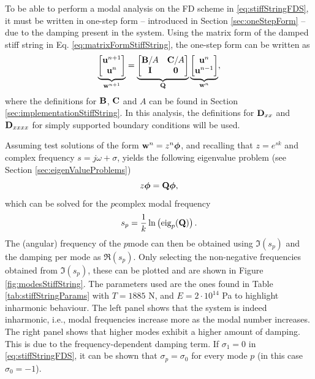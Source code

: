 {To be able to perform a modal analysis on the FD scheme in \eqref{eq:stiffStringFDS}, it must be written in one-step form -- introduced in Section \ref{sec:oneStepForm} -- due to the damping present in the system. Using the matrix form of the damped stiff string in Eq. \eqref{eq:matrixFormStiffString}, the one-step form can be written as
\begin{equation}\label{eq:oneStepFormStiffSTring}
    \underbrace{\begin{bmatrix}
        \mathbf{u}^{n+1}\\
        \mathbf{u}^n
    \end{bmatrix}}_{\mathbf{w}^{n+1}} = 
    \underbrace{\begin{bmatrix}
        \mathbf{B}/A & \mathbf{C}/A\\
        \mathbf{I} & \mathbf{0}
    \end{bmatrix}}_{\mathbf{Q}}
    \underbrace{\begin{bmatrix}
        \mathbf{u}^n\\
        \mathbf{u}^{n-1}
    \end{bmatrix}}_{\mathbf{w}^n},
\end{equation}
where the definitions for $\mathbf{B}$, $\mathbf{C}$ and $A$ can be found in Section \ref{sec:implementationStiffString}. In this analysis, the definitions for $\mathbf{D}_{xx}$ and $\mathbf{D}_{xxxx}$ for simply supported boundary conditions will be used.

Assuming test solutions of the form $\mathbf{w}^n = z^n\boldsymbol{\phi}$, and recalling that $z=e^{sk}$ and complex frequency $s = j\omega + \sigma$, yields the following eigenvalue problem (see Section \ref{sec:eigenValueProblems})
\begin{equation}
    z\boldsymbol{\phi} = \mathbf{Q} \boldsymbol{\phi},
\end{equation}
which can be solved for the $p$\th complex modal frequency
\begin{equation}
    s_p = \frac{1}{k}\ln \left(\text{eig}_p(\mathbf{Q})\right).
\end{equation}
The (angular) frequency of the $p$\th mode can then be obtained using $\mathfrak{I}(s_p)$ and the damping per mode as $\mathfrak{R}(s_p)$. Only selecting the non-negative frequencies obtained from $\mathfrak{I}(s_p)$, these can be plotted and are shown in Figure \ref{fig:modesStiffString}. The parameters used are the ones found in Table \ref{tab:stiffStringParams} with $T = 1885$ N, and $E = 2\cdot 10^{14}$ Pa to highlight inharmonic behaviour. The left panel shows that the system is indeed inharmonic, i.e., modal frequencies increase more as the modal number increases. The right panel shows that higher modes exhibit a higher amount of damping. This is due to the frequency-dependent damping term. If $\sigma_1 = 0$ in \eqref{eq:stiffStringFDS}, it can be shown that $\sigma_p = \sigma_0$ for every mode $p$ (in this case $\sigma_0 = -1$).

}
